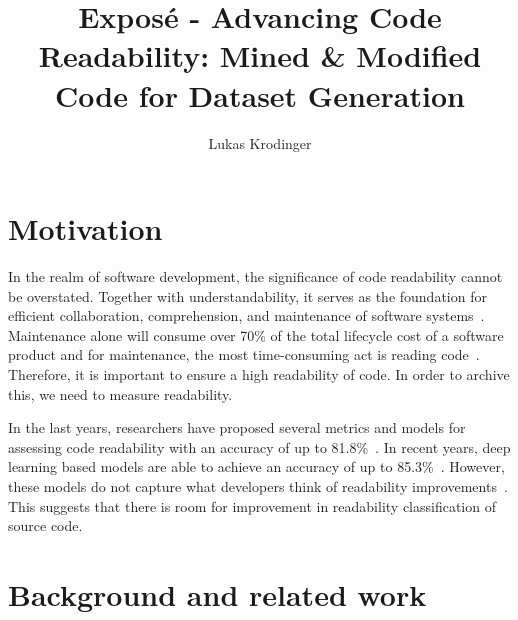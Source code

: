 \documentclass[%
class=scrreprt,
chapterprefix=false,%
open=right,%
twoside=false,%
paper=a4,%
logofile={Logo\_zentral\_farbig\_EN.png},%
thesistype=masterproposal,%
UKenglish,%
]{se2thesis}
\author{Lukas Krodinger}
\title{Exposé - Advancing Code Readability: Mined \& Modified Code for Dataset Generation}
\institute{Chair of Software Engineering II}
\begin{document}
	
	\frontmatter
	
	\maketitle
	
	\mainmatter
	
	\section{Motivation} \label{Motivation}
	
	
	In the realm of software development, the significance of code readability cannot be overstated. Together with understandability, it 	serves as the foundation for efficient collaboration, comprehension, and maintenance of software systems~\cite{posnett2011simpler, aggarwal2002integrated}. 
	Maintenance alone will consume over 70\% of the total lifecycle cost of a software product and for maintenance, the most time-consuming act is reading code~\cite{buse2009learning, deimel1985uses, rugaber2000use, boehm2001defect}.
	Therefore, it is important to ensure a high readability of code. In order to archive this, we need to measure readability.
	
	In the last years, researchers have proposed several metrics and models for assessing code readability with an accuracy of up to 81.8\%~\cite{buse2009learning, posnett2011simpler, dorn2012general, daka2015modeling}. In recent years, deep learning based models are able to achieve an accuracy of up to 85.3\%~\cite{mi2018improving, mi2022towards}.
	However, these models do not capture what developers think of readability improvements~\cite{fakhoury2019improving}. This suggests that there is room for improvement in readability classification of source code.
	
	\section{Background and related work} \label{Background and related work}
	
\end{document}
